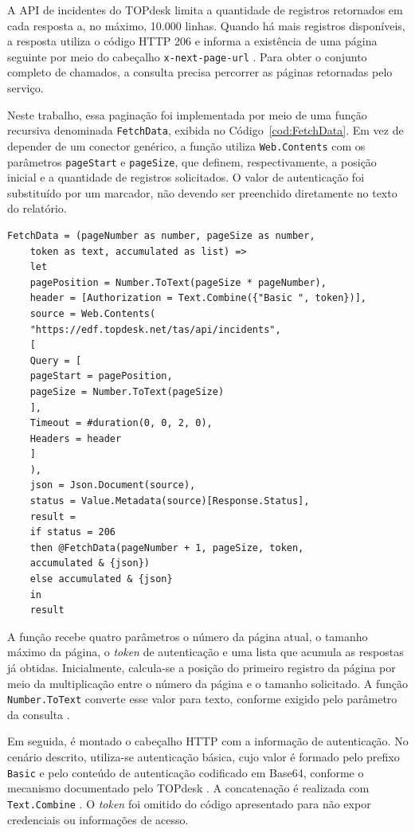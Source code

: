 A API de incidentes do TOPdesk limita a quantidade de registros retornados em cada resposta a, no máximo, 10.000 linhas. Quando há mais registros disponíveis, a resposta utiliza o código HTTP 206 e informa a existência de uma página seguinte por meio do cabeçalho \texttt{x-next-page-url} \cite{TOPdesk_Incident_API}. Para obter o conjunto completo de chamados, a consulta precisa percorrer as páginas retornadas pelo serviço.

Neste trabalho, essa paginação foi implementada por meio de uma função recursiva denominada \texttt{FetchData}, exibida no Código~\ref{cod:FetchData}. Em vez de depender de um conector genérico, a função utiliza \texttt{Web.Contents} com os parâmetros \texttt{pageStart} e \texttt{pageSize}, que definem, respectivamente, a posição inicial e a quantidade de registros solicitados. O valor de autenticação foi substituído por um marcador, não devendo ser preenchido diretamente no texto do relatório.\\

\begin{lstlisting}[caption={Função \texttt{FetchData}.}, label = {cod:FetchData}]
	FetchData = (pageNumber as number, pageSize as number,
	token as text, accumulated as list) =>
	let
	pagePosition = Number.ToText(pageSize * pageNumber),
	header = [Authorization = Text.Combine({"Basic ", token})],
	source = Web.Contents(
	"https://edf.topdesk.net/tas/api/incidents",
	[
	Query = [
	pageStart = pagePosition,
	pageSize = Number.ToText(pageSize)
	],
	Timeout = #duration(0, 0, 2, 0),
	Headers = header
	]
	),
	json = Json.Document(source),
	status = Value.Metadata(source)[Response.Status],
	result =
	if status = 206
	then @FetchData(pageNumber + 1, pageSize, token,
	accumulated & {json})
	else accumulated & {json}
	in
	result
\end{lstlisting}


A função recebe quatro parâmetros o número da página atual, o tamanho máximo da página, o \textit{token} de autenticação e uma lista que acumula as respostas já obtidas. Inicialmente, calcula-se a posição do primeiro registro da página por meio da multiplicação entre o número da página e o tamanho solicitado. A função \texttt{Number.ToText} converte esse valor para texto, conforme exigido pelo parâmetro da consulta \cite{NumberToText}.

Em seguida, é montado o cabeçalho HTTP com a informação de autenticação. No cenário descrito, utiliza-se autenticação básica, cujo valor é formado pelo prefixo \texttt{Basic} e pelo conteúdo de autenticação codificado em Base64, conforme o mecanismo documentado pelo TOPdesk \cite{TOPdesk_Login}. A concatenação é realizada com \texttt{Text.Combine} \cite{TextCombine}. O \textit{token} foi omitido do código apresentado para não expor credenciais ou informações de acesso.


